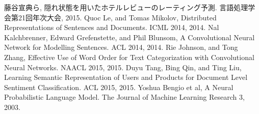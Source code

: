 \documentclass[twocolumn,a4paper]{ltjarticle}
\begin{document}

\begin{thebibliography}{9}
  藤谷宣典ら,
  隠れ状態を用いたホテルレビューのレーティング予測.
  言語処理学会第21回年次大会, 2015.
  Quoc Le, and Tomas Mikolov,
  Distributed Representations of Sentences and Documents.
  ICML 2014, 2014.
  Nal Kalchbrenner, Edward Grefenstette, and Phil Blunsom,
  A Convolutional Neural Network for Modelling Sentences.
  ACL 2014, 2014.
  Rie Johnson, and Tong Zhang,
  Effective Use of Word Order for Text Categorization
  with Convolutional Neural Networks.
  NAACL 2015, 2015.
  Duyu Tang, Bing Qin, and Ting Liu,
  Learning Semantic Representation of Users and Products
  for Document Level Sentiment Classification.
  ACL 2015, 2015.
  Yoshua Bengio et al,
  A Neural Probabilistic Language Model.
  The Journal of Machine Learning Research 3, 2003.
\end{thebibliography}
\end{document}
